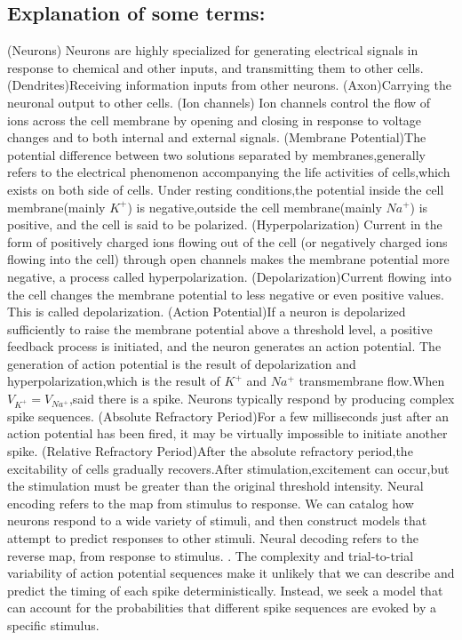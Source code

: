 \documentclass[letterpaper,oneside]{book}
\numberwithin{equation}{chapter}
\theoremstyle{definition}
\begin{document}
\begin{multicols}{2}
\subsection{Explanation of some terms:}
\ntn (Neurons) Neurons are highly specialized for generating electrical signals in response to chemical and other inputs, and transmitting them to other cells.
\ntn (Dendrites)Receiving information inputs from other neurons.
\ntn (Axon)Carrying the neuronal output to other cells.
\ntn (Ion channels) Ion channels control the flow of ions across the cell membrane by opening and closing in response to voltage changes and to both internal and external signals.
\ntn (Membrane Potential)The potential difference between two solutions separated by membranes,generally refers to the electrical phenomenon accompanying the life activities of cells,which exists on both side of cells.
\rem Under resting conditions,the potential inside the cell membrane(mainly $K^+$) is negative,outside the cell membrane(mainly $Na^+$) is positive, and the cell is said to be polarized.
\ntn (Hyperpolarization) Current in the form of positively charged ions flowing out of the cell (or negatively charged ions flowing into the cell) through open channels makes the membrane potential more negative, a process called hyperpolarization.
\ntn (Depolarization)Current flowing into the cell changes the membrane potential to less negative or even positive values. This is called depolarization.
\ntn (Action Potential)If a neuron is depolarized sufficiently to raise the membrane potential above a threshold level, a positive feedback process is initiated, and the neuron generates an action potential.
\rem The generation of action potential is the result of depolarization and hyperpolarization,which is the result of $K^+$ and $Na^+$ transmembrane flow.When $V_{K^+}=V_{Na^+}$,said there is a spike.
\rem Neurons typically respond by producing complex spike sequences.
\ntn (Absolute Refractory Period)For a few milliseconds just after an action potential has been fired, it may be virtually impossible to initiate another spike.
\ntn (Relative Refractory Period)After the absolute refractory period,the excitability of cells gradually recovers.After stimulation,excitement can occur,but the stimulation must be greater than the original threshold intensity.
 Neural encoding refers to the map from stimulus to response.
\exm We can catalog how neurons respond to a wide variety of stimuli, and then construct models that attempt to predict responses to other stimuli.
 Neural decoding refers to the reverse map, from response to stimulus.
%
\rem . The complexity and trial-to-trial variability of action potential sequences make it unlikely that we can describe and predict the timing of each spike deterministically. Instead, we seek a model that can account for the probabilities that different spike sequences are evoked by a specific stimulus.






\end{multicols}
\end{document}
